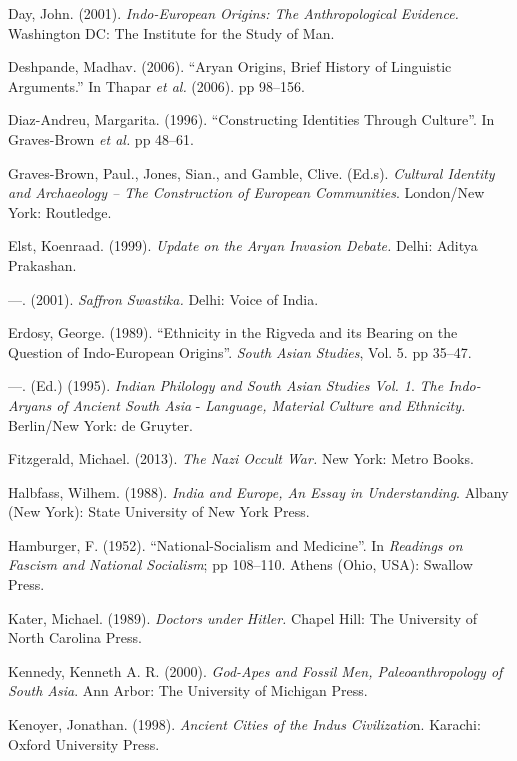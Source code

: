 \begin{thebibliography}{99}
  Day, John. (2001). \textit{Indo-European Origins: The Anthropological Evidence.} Washington DC: The Institute for the Study of Man.

  Deshpande, Madhav. (2006). “Aryan Origins, Brief History of Linguistic Arguments.” In Thapar \textit{et al.} (2006). pp 98--156.

  Diaz-Andreu, Margarita. (1996). “Constructing Identities Through Culture”. In Graves-Brown \textit{et al.} pp 48--61.

  Graves-Brown, Paul., Jones, Sian., and Gamble, Clive. (Ed.s). \textit{Cultural Identity and Archaeology – The Construction of European Communities}. London/New York: Routledge.

  Elst, Koenraad. (1999). \textit{Update on the Aryan Invasion Debate. }Delhi: Aditya Prakashan.

  —. (2001). \textit{Saffron Swastika. }Delhi: Voice of India.

  Erdosy, George. (1989). “Ethnicity in the Rigveda and its Bearing on the Question of Indo-European Origins”. \textit{South Asian Studies}, Vol. 5. pp 35--47.

  —. (Ed.) (1995). \textit{Indian Philology and South Asian Studies Vol. 1}. \textit{The Indo-Aryans of Ancient South Asia} - \textit{Language, Material Culture and Ethnicity. } Berlin/New York: de Gruyter.

  Fitzgerald, Michael. (2013). \textit{The Nazi Occult War. }New York: Metro Books.

  Halbfass, Wilhem. (1988). \textit{India and Europe, An Essay in Understanding}. Albany (New York): State University of New York Press.

  Hamburger, F. (1952). “National-Socialism and Medicine”. In \textit{Readings on Fascism and National Socialism}; pp 108--110. Athens (Ohio, USA): Swallow Press.

  Kater, Michael. (1989). \textit{Doctors under Hitler.} Chapel Hill: The University of North Carolina Press.

  Kennedy, Kenneth A. R. (2000). \textit{God-Apes and Fossil Men, Paleoanthropology of South Asia}. Ann Arbor: The University of Michigan Press.

  Kenoyer, Jonathan. (1998). \textit{Ancient Cities of the Indus Civilizatio}n. Karachi: Oxford University Press.


\end{thebibliography}
